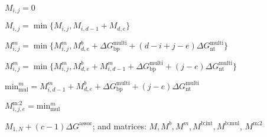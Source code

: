 \begin{algorithm}[H]
\begin{algorithmic}[1]
		$M_{i,j} = 0$ 
		
		\EndIf
		
		 
		
		
		
		$M_{i,j} = \min \{M_{i,j}, M_{i,d-1} + M_{d,e} \}$
		\EndIf
		
		
		\State $M_{i,j}^m = \min \{M_{i,j}^m, M^b_{d,e} + \Delta G_\text{bp}^\text{multi} + (d-i + j-e)\Delta G_\text{nt}^\text{multi}\}$
		
		\EndIf
		\State $M_{i,j}^m = \min \{M_{i,j}^m, M^b_{d,e} + M^m_{i,d-1} + \Delta G_\text{bp}^\text{multi} + (j-e)\Delta G_\text{nt}^\text{multi}\}$
		
		
		\State $\text{min}_\text{mul}^m  =   M^m_{i,d-1} + M^b_{d,e} + \Delta G_\text{bp}^\text{multi} + (j-e)\Delta G_\text{nt}^\text{multi}$
		
		\EndIf
		
		\EndIf
		
		\EndIf
		
		\EndFor
		\State $M_{i,j,e}^\text{m:2} = \text{min}_\text{mul}^m $
		\EndFor
		
		\EndFor
		\EndFor {} 
		\State \Return $M_{1,N} + (c-1) \Delta G^\text{assoc}$; 
		and matrices: $M, M^b, M^m, M^\text{b:int}, M^\text{b:mul}$,  $M^\text{m:2}$
		
		
		
	\end{algorithmic}
\end{algorithm}







